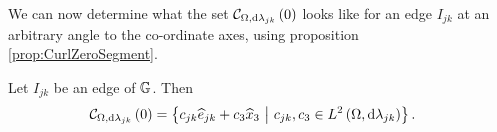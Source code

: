 We can now determine what the set $\mathcal{C}_{ \Omega, \mathrm{d}\lambda_{jk}}\left( 0 \right)$ looks like for an edge $I_{jk}$ at an arbitrary angle to the co-ordinate axes, using proposition \ref{prop:CurlZeroSegment}.
\begin{cory} \label{cory:CurlZeroRotated}
	Let $I_{jk}$ be an edge of $\mathbb{G}$.
	Then
	\begin{align*}
		\mathcal{C}_{ \Omega, \mathrm{d}\lambda_{jk}}\left( 0 \right) &= 
		\left\{  c_{jk}\widehat{e}_{jk} + c_3\widehat{x}_3 \ \middle\vert \  c_{jk}, c_3\in L^{2}\left( \Omega,\mathrm{d}\lambda_{jk} \right)  \right\}.
	\end{align*}
\end{cory}
